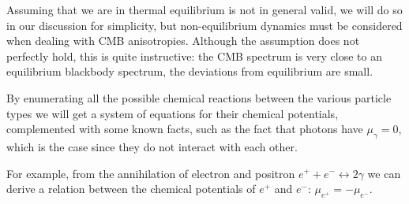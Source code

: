 \documentclass[main.tex]{subfiles}
\begin{document}
Assuming that we are in thermal equilibrium is not in general valid, we will do so in our discussion for simplicity, but non-equilibrium dynamics must be considered when dealing with CMB anisotropies.
Although the assumption does not perfectly hold, this is quite instructive: the CMB spectrum is very close to an equilibrium blackbody spectrum, the deviations from equilibrium are small.

By enumerating all the possible chemical reactions between the various particle types we will get a system of equations for their chemical potentials, complemented with some known facts, such as the fact that photons have \(\mu_{\gamma }=0\), which is the case since they do not interact with each other.

For example, from the annihilation of electron and positron \(e^{+}+ e^{-} \leftrightarrow 2 \gamma \) we can derive a relation between the chemical potentials of \(e^{+}\) and \(e^{-}\):  \(\mu _{e^{+}} = - \mu_{e^{-}}\).

\end{document}
